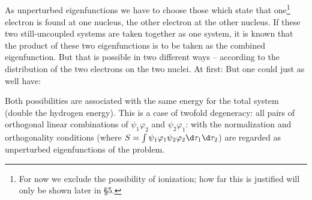 \begin{paper}{1}
\subsection{} As unperturbed eigenfunctions we have to choose those which state that one\footnote{For now we exclude the possibility of ionization; how far this is justified will only be shown later in \S5.} electron is found at one nucleus, the other electron at the other nucleus. If these two still-uncoupled systems are taken together as one system, it is known that the product of these two eigenfunctions is to be taken as the combined eigenfunction. But that is possible in two different ways -- according to the distribution of the two electrons on the two nuclei. At first:
But one could just as well have:

Both possibilities are associated with the same energy for the total system (double the hydrogen energy). This is a case of twofold degeneracy: all pairs of orthogonal linear combinations of $\psi_1\varphi_2$ and $\psi_2\varphi_1$:
with the normalization and orthogonality conditions
(where $S=\int\psi_1\varphi_1\psi_2\varphi_2\d\tau_1\d\tau_2$) are regarded as unperturbed eigenfunctions of the problem.


\end{paper}
